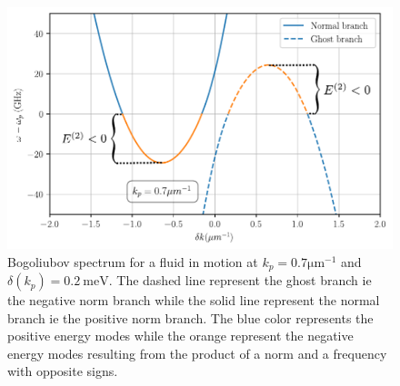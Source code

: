 \begin{figure}[!htbp]
    \centering
    \includegraphics[width=\textwidth]{chap_AG_theory/fig/bogo_gap_supersonic_dispersion.pdf}
    \caption{Bogoliubov spectrum for a fluid in motion at $k_p=0.7 \mathrm{\mu m^{-1}}$ and $\delta(k_p)=0.2 \ \mathrm{meV}$. The dashed line represent the ghost branch ie the negative norm branch while the solid line
    represent the normal branch ie the positive norm branch. The blue color represents the positive energy modes while the orange represent the negative energy modes resulting from the 
    product of a norm and a frequency with opposite signs.}
    \label{fig:gapped_supersonic}
\end{figure}

